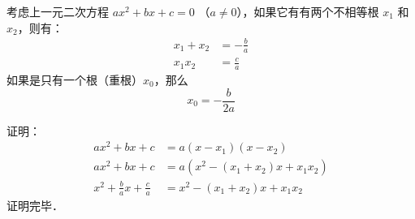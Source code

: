 

\begin{theorem}{}
考虑上一元二次方程 $a x^2 + b x + c = 0$ （$a \neq 0$），如果它有有两个不相等根 $x_1$ 和 $x_2$，则有：
$$\begin{aligned}
x_1 + x_2 &= -\frac{b}{a} \\
x_1 x_2 &= \frac{c}{a}
\end{aligned}$$
如果是只有一个根（重根）$x_0$，那么
$$
x_0 = - \frac{b}{2 a}
$$
\end{theorem}

证明：
$$\begin{aligned}
a x^2 + b x + c &= a (x - x_1) (x - x_2) \\
a x^2 + b x + c &= a (x^2 - (x_1 + x_2) x + x_1 x_2) \\
x^2 + \frac{b}{a} x + \frac{c}{a} &=  x^2 - (x_1 + x_2) x + x_1 x_2
\end{aligned}$$
证明完毕．
